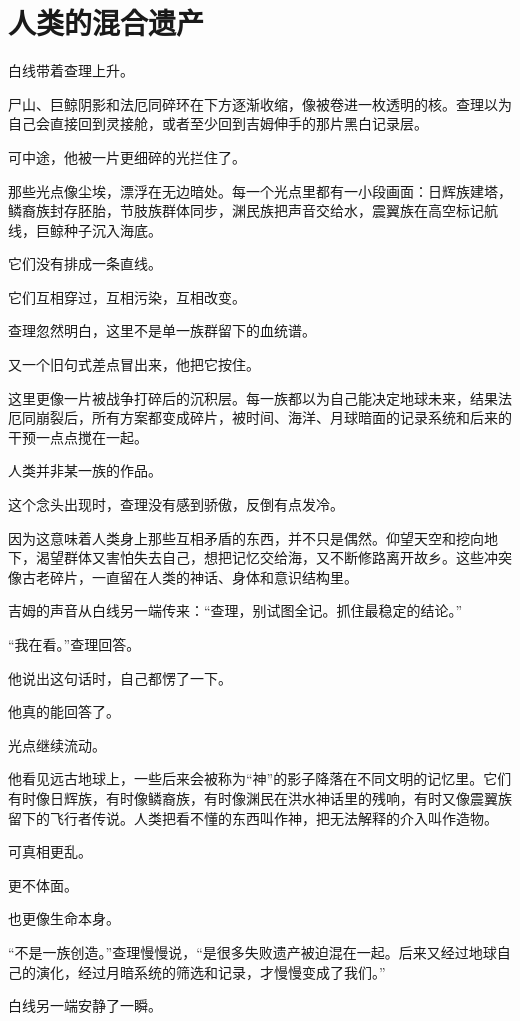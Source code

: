 \chapter{人类的混合遗产}

白线带着查理上升。

尸山、巨鲸阴影和法厄同碎环在下方逐渐收缩，像被卷进一枚透明的核。查理以为自己会直接回到灵接舱，或者至少回到吉姆伸手的那片黑白记录层。

可中途，他被一片更细碎的光拦住了。

那些光点像尘埃，漂浮在无边暗处。每一个光点里都有一小段画面：日辉族建塔，鳞裔族封存胚胎，节肢族群体同步，渊民族把声音交给水，震翼族在高空标记航线，巨鲸种子沉入海底。

它们没有排成一条直线。

它们互相穿过，互相污染，互相改变。

查理忽然明白，这里不是单一族群留下的血统谱。

又一个旧句式差点冒出来，他把它按住。

这里更像一片被战争打碎后的沉积层。每一族都以为自己能决定地球未来，结果法厄同崩裂后，所有方案都变成碎片，被时间、海洋、月球暗面的记录系统和后来的干预一点点搅在一起。

人类并非某一族的作品。

这个念头出现时，查理没有感到骄傲，反倒有点发冷。

因为这意味着人类身上那些互相矛盾的东西，并不只是偶然。仰望天空和挖向地下，渴望群体又害怕失去自己，想把记忆交给海，又不断修路离开故乡。这些冲突像古老碎片，一直留在人类的神话、身体和意识结构里。

吉姆的声音从白线另一端传来：“查理，别试图全记。抓住最稳定的结论。”

“我在看。”查理回答。

他说出这句话时，自己都愣了一下。

他真的能回答了。

光点继续流动。

他看见远古地球上，一些后来会被称为“神”的影子降落在不同文明的记忆里。它们有时像日辉族，有时像鳞裔族，有时像渊民在洪水神话里的残响，有时又像震翼族留下的飞行者传说。人类把看不懂的东西叫作神，把无法解释的介入叫作造物。

可真相更乱。

更不体面。

也更像生命本身。

“不是一族创造。”查理慢慢说，“是很多失败遗产被迫混在一起。后来又经过地球自己的演化，经过月暗系统的筛选和记录，才慢慢变成了我们。”

白线另一端安静了一瞬。

